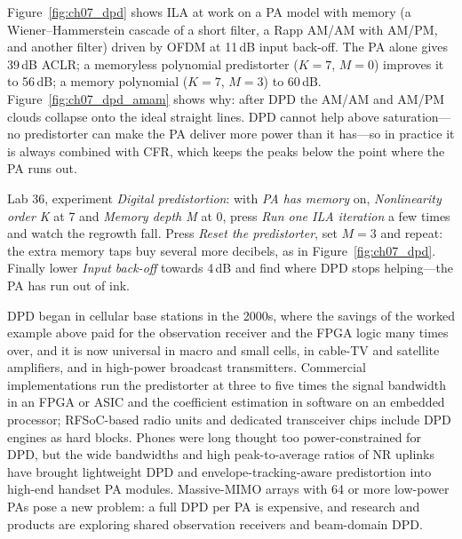 Figure~\ref{fig:ch07_dpd} shows ILA at work on a PA model with memory (a Wiener--Hammerstein cascade of a
short filter, a Rapp AM/AM with AM/PM, and another filter) driven by OFDM at 11\,dB input back-off. The PA
alone gives 39\,dB ACLR; a memoryless polynomial predistorter ($K=7$, $M=0$) improves it to 56\,dB; a memory
polynomial ($K=7$, $M=3$) to 60\,dB. Figure~\ref{fig:ch07_dpd_amam} shows why: after DPD the AM/AM and
AM/PM clouds collapse onto the ideal straight lines. DPD cannot help above saturation---no predistorter can
make the PA deliver more power than it has---so in practice it is always combined with CFR, which keeps
the peaks below the point where the PA runs out.



\begin{tryit}
Lab 36, experiment \emph{Digital predistortion}: with \emph{PA has memory} on, \emph{Nonlinearity order K}
at 7 and \emph{Memory depth M} at 0, press \emph{Run one ILA iteration} a few times and watch the
regrowth fall. Press \emph{Reset the predistorter}, set $M=3$ and repeat: the extra memory taps buy
several more decibels, as in Figure~\ref{fig:ch07_dpd}. Finally lower \emph{Input back-off} towards
4\,dB and find where DPD stops helping---the PA has run out of ink.
\end{tryit}

\begin{inpractice}
DPD began in cellular base stations in the 2000s, where the savings of the worked example above paid for
the observation receiver and the FPGA logic many times over, and it is now universal in macro and small
cells, in cable-TV and satellite amplifiers, and in high-power broadcast transmitters. Commercial
implementations run the predistorter at three to five times the signal bandwidth in an FPGA or ASIC and
the coefficient estimation in software on an embedded processor; RFSoC-based radio units and dedicated
transceiver chips include DPD engines as hard blocks. Phones were long thought too power-constrained for
DPD, but the wide bandwidths and high peak-to-average ratios of NR uplinks have brought lightweight DPD
and envelope-tracking-aware predistortion into high-end handset PA modules. Massive-MIMO arrays with 64 or
more low-power PAs pose a new problem: a full DPD per PA is expensive, and research and products are
exploring shared observation receivers and beam-domain DPD.
\end{inpractice}

